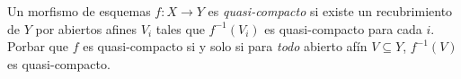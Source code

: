 \documentclass[twoside]{article}
\begin{document}
%
\begin{ejercicio}{2.16}

\end{ejercicio}
\begin{solucion}
Un morfismo de esquemas $f:X\to Y$ es \emph{quasi-compacto} si existe un recubrimiento de $Y$ por abiertos afines $V_i$ tales que $f^{-1}(V_i)$ es quasi-compacto para cada $i$. Porbar que $f$ es quasi-compacto si y solo si para \emph{todo} abierto afín $V\subseteq Y$, $f^{-1}(V)$ es quasi-compacto.
\end{solucion}
%
\end{document}
